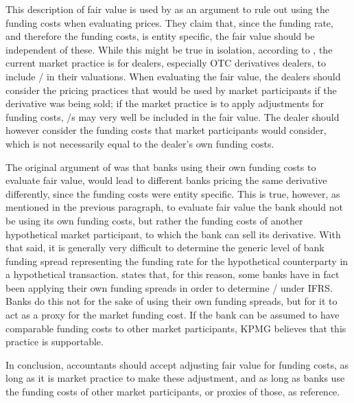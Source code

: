 \documentclass[main.tex]{subfiles}
\begin{document}
            This description of fair value is used by \textcite{HullWhiteFVA} as an argument to
            rule out using the funding costs when evaluating prices.
            They claim that, since the funding rate, and therefore the funding costs, is entity specific,
            the fair value should be independent of these.
            While this might be true in isolation, 
            according to \textcite{KPMGFVA}, the current market practice is for dealers, 
            especially OTC derivatives dealers, to include \FVA/ in their valuations.  
            When evaluating the fair value, the dealers should consider the pricing practices 
            that would be used by market participants if the derivative was being sold;
            if the market practice is to apply adjustments for funding costs,
            \FVA/s may very well be included in the fair value.
            The dealer should however consider the funding costs that market participants would consider,
            which is not necessarily equal to the dealer's own funding costs.

            The original argument of \textcite{HullWhiteFVA} was that banks using their own funding costs to evaluate fair value,
            would lead to different banks pricing the same derivative differently,
            since the funding costs were entity specific.
            This is true, however, as mentioned in the previous paragraph,
            to evaluate fair value the bank should not be using its own funding costs, 
            but rather the funding costs of another hypothetical market participant, 
            to which the bank can sell its derivative.
            With that said, it is generally very difficult to determine the generic level of bank funding spread
            representing the funding rate for the hypothetical counterparty in a hypothetical transaction.
            \textcite[Proposition 4]{KPMGFVA} states that, for this reason,
            some banks have in fact been applying their own funding spreads in order to determine \FVA/ under IFRS. 
            Banks do this not for the sake of using their own funding spreads,
            but for it to act as a proxy for the market funding cost.
            If the bank can be assumed to have comparable funding costs to other market participants,
            KPMG believes that this practice is supportable.

            In conclusion, accountants should accept adjusting fair value for funding costs,
            as long as it is market practice to make these adjustment,
            and as long as banks use the funding costs of other market participants, 
            or proxies of those, as reference.
\end{document}
